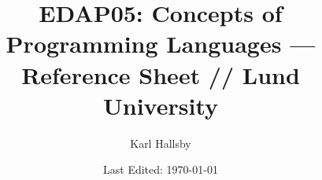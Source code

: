 

\usepackage[outputdir=./TeX_Output]{minted} %



\newcommand{\Nonterminal}[1]{\langle \text{#1} \rangle} %
\newcommand{\MathNonterminal}[1]{\langle #1 \rangle} %
\newcommand{\DataType}{\SemanticType{\tau}}
\newcommand{\SemanticRuleName}[1]{\textcolor{Red1}{(\text{\textit{#1}})}}
\newcommand{\SemanticInput}[1]{\textcolor{Green4}{#1}}
\newcommand{\SemanticOutput}[1]{\textcolor{Orange4}{#1}}
\newcommand{\SemanticType}[1]{\textcolor{Blue4}{#1}}
\newcommand{\SemanticValue}[1]{\textcolor{Yellow4}{#1}}
\DeclareMathOperator{\EvaluatesTo}{\Downarrow}

\newcommand{\OrangeText}[1]{\textcolor{Orange3}{#1}}

\begin{titlepage}
  \title{EDAP05: Concepts of Programming Languages --- Reference Sheet // Lund University}
  \author{Karl Hallsby}
  \date{Last Edited: \today} %
\end{titlepage}


\maketitle
{} %
\tableofcontents
\clearpage
\listoftheorems[ignoreall, show={definition, Definition}]
\clearpage
{} %

